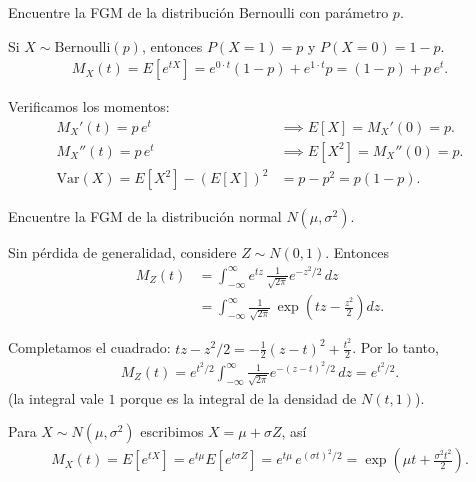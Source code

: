 \begin{ejemplo}
 \label{exmp:2.8.4}
Encuentre la FGM de la distribución Bernoulli con parámetro $p$.
\end{ejemplo}

\begin{solucion}
Si $X \sim \text{Bernoulli}(p)$, entonces $P(X=1) = p$ y $P(X=0) = 1-p$.
\begin{align}
 M_X(t) = E[e^{tX}] = e^{0 \cdot t}(1-p) + e^{1 \cdot t}p
 = (1-p) + p\,e^t.
\end{align}

Verificamos los momentos:
\begin{align}
 M_X'(t) = p\,e^t &\implies E[X] = M_X'(0) = p. \\
 M_X''(t) = p\,e^t &\implies E[X^2] = M_X''(0) = p. \\
 \text{Var}(X) = E[X^2] - (E[X])^2 &= p - p^2 = p(1-p).
\end{align}
\end{solucion}

\begin{ejemplo}
 \label{exmp:2.8.5}
Encuentre la FGM de la distribución normal $N(\mu, \sigma^2)$.
\end{ejemplo}

\begin{solucion}
Sin pérdida de generalidad, considere $Z \sim N(0,1)$. Entonces
\begin{align}
 M_Z(t) &= \int_{-\infty}^{\infty} e^{tz}\,\frac{1}{\sqrt{2\pi}}e^{-z^2/2}\,dz \\
 &= \int_{-\infty}^{\infty} \frac{1}{\sqrt{2\pi}}\,\exp\!\left(tz - \frac{z^2}{2}\right)dz.
\end{align}

Completamos el cuadrado: $tz - z^2/2 = -\frac{1}{2}(z - t)^2 + \frac{t^2}{2}$. Por lo tanto,
\begin{align}
 M_Z(t) = e^{t^2/2}\int_{-\infty}^{\infty} \frac{1}{\sqrt{2\pi}}e^{-(z-t)^2/2}\,dz = e^{t^2/2}.
\end{align}
(la integral vale $1$ porque es la integral de la densidad de $N(t, 1)$).

Para $X \sim N(\mu,\sigma^2)$ escribimos $X = \mu + \sigma Z$, así
\begin{align}
 \label{eq:2.8.14}
 M_X(t) = E[e^{tX}] = e^{t\mu}E[e^{t\sigma Z}] = e^{t\mu}\,e^{(\sigma t)^2/2}
 = \exp\!\left(\mu t + \frac{\sigma^2 t^2}{2}\right).
\end{align}
\end{solucion}


